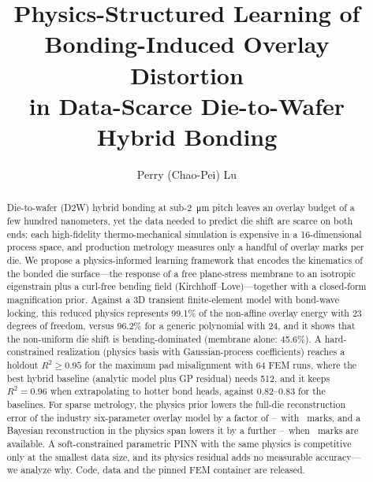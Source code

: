 \documentclass[11pt]{article}
\title{Physics-Structured Learning of Bonding-Induced Overlay Distortion\\ in Data-Scarce Die-to-Wafer Hybrid Bonding}
\author{Perry (Chao-Pei) Lu}
\date{}
\begin{document}
\maketitle

\begin{abstract}
Die-to-wafer (D2W) hybrid bonding at sub-\SI{2}{\micro\meter} pitch leaves an overlay budget of a few hundred
nanometers, yet the data needed to predict die shift are scarce on both ends: each high-fidelity
thermo-mechanical simulation is expensive in a 16-dimensional process space, and production metrology
measures only a handful of overlay marks per die. We propose a physics-informed learning framework that
encodes the kinematics of the bonded die surface---the response of a free plane-stress membrane to an
isotropic eigenstrain plus a curl-free bending field (Kirchhoff--Love)---together with a closed-form
magnification prior. Against a 3D transient finite-element model with bond-wave locking, this reduced physics
represents 99.1\% of the non-affine overlay energy with 23 degrees of freedom, versus 96.2\% for a generic
polynomial with 24, and it shows that the non-uniform die shift is bending-dominated (membrane alone: 45.6\%).
A hard-constrained realization (physics basis with Gaussian-process coefficients) reaches a holdout
$R^2\geq0.95$ for the maximum pad misalignment with 64 FEM runs, where the best hybrid baseline (analytic model
plus GP residual) needs 512, and it keeps $R^2=0.96$ when extrapolating to hotter bond heads, against 0.82--0.83
for the baselines. For sparse metrology, the physics prior lowers the full-die reconstruction error of the industry six-parameter
overlay model by a factor of \EtwoPriorGainFourSmall--\EtwoPriorGainFourLarge\ with \EtwoKFour~marks, and a Bayesian
reconstruction in the physics span lowers it by a further \EtwoBasisGainSixteenLarge--\EtwoBasisGainSixteenSmall\ when
\EtwoKSixteen~marks are available. A soft-constrained parametric PINN with
the same physics is competitive only at the smallest data size, and its physics residual adds no measurable
accuracy---we analyze why. Code, data and the pinned FEM container are released.
\end{abstract}
\end{document}
